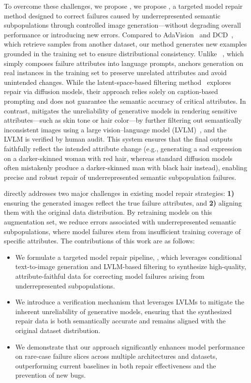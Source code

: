 To overcome these challenges, we propose \model, we propose \model, a targeted model repair method designed to correct failures caused by underrepresented semantic subpopulations through controlled image generation—without degrading overall performance or introducing new errors. Compared to AdaVision~\cite{gao2023adaptive} and DCD~\cite{singla2024data}, which retrieve samples from another dataset, our method generates new examples grounded in the training set to ensure distributional consistency. Unlike \hibug~\cite{chen2023hibug}, which simply composes failure attributes into language prompts, \model anchors generation on real instances in the training set to preserve unrelated attributes and avoid unintended changes. While the latent-space-based filtering method~\cite{jain2023latentfailures} explores repair via diffusion models, their approach relies solely on caption-based prompting and does not guarantee the semantic accuracy of critical attributes. In contrast, \model mitigates the unreliability of generative models in rendering sensitive attributes—such as skin tone or hair color—by further filtering out semantically inconsistent images using a large vision--language model (LVLM)~\cite{bai2025qwen25vl, liu2023improvedllava}, and the LVLM is verified by human audit. This  system ensures that the final outputs faithfully reflect the intended attribute change (e.g., generating a sad expression on a darker-skinned woman with red hair, whereas standard diffusion models often mistakenly produce a darker-skinned man with black hair instead), enabling precise and robust repair of underrepresented semantic subpopulation failures.

\model directly addresses two major challenges in existing model repair strategies: {\bf 1)} ensuring the generated images reflect the true failure attributes, and {\bf 2)} aligning them with the original data distribution. By retraining models on this augmentation set, we reduce errors associated with underrepresented semantic subpopulations, where model failures stem from insufficient training coverage of specific attributes. The contributions of this work are as follows:
\begin{itemize}
\item We formulate a targeted model repair pipeline, \model, which leverages conditional text-to-image generation and LVLM-based filtering to synthesize high-quality, attribute-faithful data for correcting model failures arising from underrepresented subpopulations.

\item We introduce a  verification mechanism that leverages LVLMs to mitigate the inherent unreliability of generative models, ensuring that the synthesized repair data is both semantically accurate and remains aligned with the original dataset distribution.

\item We demonstrate that our approach significantly enhances model performance on rare-case failure slices across multiple architectures and datasets, outperforming current baselines in both repair effectiveness and the prevention of new bugs.
\end{itemize}